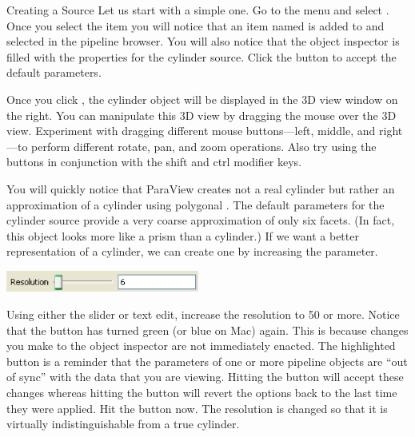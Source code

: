 \begin{exercise}{Creating a Source}
  \label{ex:CreatingASource}
  Let us start with a simple one.  Go to the  menu and select
  .  Once you select the  item you will notice
  that an item named  is added to and selected in the
  pipeline browser.  You will also notice that the object inspector is
  filled with the properties for the cylinder source.  Click the
   button \apply to accept the default parameters.

  Once you click , the cylinder object will be displayed in the
  3D view window on the right.  You can manipulate this 3D view by dragging
  the mouse over the 3D view.  Experiment with dragging different mouse
  buttons---left, middle, and right---to perform different rotate, pan, and
  zoom operations.  Also try using the buttons in conjunction with the
  shift and ctrl modifier keys.

  You will quickly notice that ParaView creates not a real cylinder but
  rather an approximation of a cylinder using polygonal .
  The default parameters for the cylinder source provide a very coarse
  approximation of only six facets. (In fact, this object looks more like a
  prism than a cylinder.) If we want a better representation of a cylinder,
  we can create one by increasing the  parameter.

  \begin{inlinefig}
    \includegraphics[width=2.5in]{images/ResolutionParameter}
  \end{inlinefig}

  Using either the slider or text edit, increase the resolution to 50 or
  more.  Notice that the  button \apply has turned green (or
  blue on Mac) again.  This is because changes you make to the object
  inspector are not immediately enacted.  The highlighted button is a
  reminder that the parameters of one or more pipeline objects are ``out of
  sync'' with the data that you are viewing.  Hitting the  button
  will accept these changes whereas hitting the  button \reset
  will revert the options back to the last time they were applied.  Hit the
   button now.  The resolution is changed so that it is
  virtually indistinguishable from a true cylinder.
\end{exercise}

